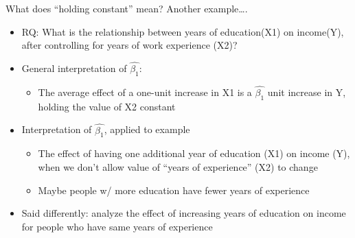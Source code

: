 \documentclass[8pt,ignorenonframetext,dvipsnames]{beamer}
\providecommand{\tightlist}{%
  \setlength{\itemsep}{0pt}\setlength{\parskip}{0pt}}
\let\olditem\item
\renewcommand{\item}{%
  \olditem\vspace{4pt}
}
\begin{document}
\begin{frame}{What does ``holding constant'' mean? Another
example\ldots{}.}
\protect\hypertarget{what-does-holding-constant-mean-another-example.}{}

\begin{itemize}
\tightlist
\item
  RQ: What is the relationship between years of education(X1) on
  income(Y), after controlling for years of work experience (X2)?
\item
  General interpretation of \(\hat{\beta_1}\):

  \begin{itemize}
  \tightlist
  \item
    The average effect of a one-unit increase in X1 is a
    \(\hat{\beta_1}\) unit increase in Y, holding the value of X2
    constant
  \end{itemize}
\item
  Interpretation of \(\hat{\beta_1}\), applied to example

  \begin{itemize}
  \tightlist
  \item
    The effect of having one additional year of education (X1) on income
    (Y), when we don't allow value of ``years of experience'' (X2) to
    change
  \item
    Maybe people w/ more education have fewer years of experience
  \end{itemize}
\item
  Said differently: analyze the effect of increasing years of education
  on income for people who have same years of experience
\end{itemize}

\end{frame}
\end{document}
